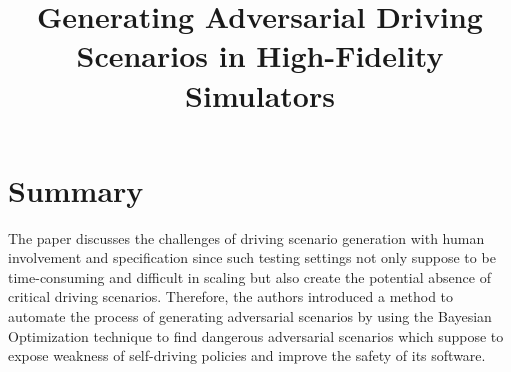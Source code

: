 \documentclass[10pt,a4paper]{report}
\title{Generating Adversarial Driving Scenarios in High-Fidelity Simulators}
\begin{document}
\begin{center}
\textbf{\thetitle}
\end{center}


\section{Summary}
The paper discusses the challenges of driving scenario generation with human involvement and specification since such testing settings not only suppose to be time-consuming and difficult in scaling but also create the potential absence of critical driving scenarios.
%
Therefore, the authors introduced a method to automate the process of generating adversarial scenarios by using the Bayesian Optimization technique to find dangerous adversarial scenarios which suppose to expose weakness of self-driving policies and improve the safety of its software.
%
\end{document}
